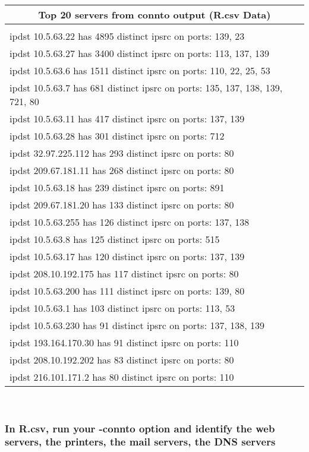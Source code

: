 \documentclass[letterpaper,10pt,titlepage,draftclsnofoot,onecolumn]{IEEEtran}
\begin{document}
\begin{tabular}{|p{12cm}|}
 \hline
 \multicolumn{1}{|c|}{Top 20 servers from connto output (R.csv Data)} \\
 \hline
 \\
		ipdst 10.5.63.22 has 4895 distinct ipsrc on ports: 139, 23\\
		ipdst 10.5.63.27 has 3400 distinct ipsrc on ports: 113, 137, 139\\
		ipdst 10.5.63.6 has 1511 distinct ipsrc on ports: 110, 22, 25, 53\\
		ipdst 10.5.63.7 has 681 distinct ipsrc on ports: 135, 137, 138, 139, 721, 80\\
		ipdst 10.5.63.11 has 417 distinct ipsrc on ports: 137, 139\\
		ipdst 10.5.63.28 has 301 distinct ipsrc on ports: 712\\
		ipdst 32.97.225.112 has 293 distinct ipsrc on ports: 80\\
		ipdst 209.67.181.11 has 268 distinct ipsrc on ports: 80\\
		ipdst 10.5.63.18 has 239 distinct ipsrc on ports: 891\\
		ipdst 209.67.181.20 has 133 distinct ipsrc on ports: 80\\
		ipdst 10.5.63.255 has 126 distinct ipsrc on ports: 137, 138\\
		ipdst 10.5.63.8 has 125 distinct ipsrc on ports: 515\\
		ipdst 10.5.63.17 has 120 distinct ipsrc on ports: 137, 139\\
		ipdst 208.10.192.175 has 117 distinct ipsrc on ports: 80\\
		ipdst 10.5.63.200 has 111 distinct ipsrc on ports: 139, 80\\
		ipdst 10.5.63.1 has 103 distinct ipsrc on ports: 113, 53\\
		ipdst 10.5.63.230 has 91 distinct ipsrc on ports: 137, 138, 139\\
		ipdst 193.164.170.30 has 91 distinct ipsrc on ports: 110\\
		ipdst 208.10.192.202 has 83 distinct ipsrc on ports: 80\\
		ipdst 216.101.171.2 has 80 distinct ipsrc on ports: 110\\
 \hline
\end{tabular}

\hfill\\

\subsubsection{In R.csv, run your -connto option and identify the web servers, the printers, the mail servers, the DNS servers}
\hfill\\
\end{document}
